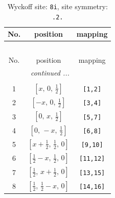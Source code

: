 \documentclass[fleqn,8pt]{jsarticle}
\begin{document}
\begin{longtable}{ccc}
\caption{Wyckoff site: {\tt 8i}, site symmetry: {\tt .2.}}
 \\
 \hline \hline
No. & position & mapping \\ \hline \endfirsthead

\multicolumn{2}{l}{\tablename\ \thetable{}} \\
 \hline \hline
No. & position & mapping \\ \hline \endhead

 \hline \hline
\multicolumn{2}{r}{\footnotesize\it continued ...} \\ \endfoot

 \hline \hline
\multicolumn{2}{r}{} \\ \endlastfoot

1 & $\left[ x,\, 0,\, \frac{1}{2} \right]$ & {\tt [1,2]} \\ \hline
2 & $\left[ - x,\, 0,\, \frac{1}{2} \right]$ & {\tt [3,4]} \\ \hline
3 & $\left[ 0,\, x,\, \frac{1}{2} \right]$ & {\tt [5,7]} \\ \hline
4 & $\left[ 0,\, - x,\, \frac{1}{2} \right]$ & {\tt [6,8]} \\ \hline
5 & $\left[ x + \frac{1}{2},\, \frac{1}{2},\, 0 \right]$ & {\tt [9,10]} \\ \hline
6 & $\left[ \frac{1}{2} - x,\, \frac{1}{2},\, 0 \right]$ & {\tt [11,12]} \\ \hline
7 & $\left[ \frac{1}{2},\, x + \frac{1}{2},\, 0 \right]$ & {\tt [13,15]} \\ \hline
8 & $\left[ \frac{1}{2},\, \frac{1}{2} - x,\, 0 \right]$ & {\tt [14,16]} \\
\end{longtable}
\renewcommand{\arraystretch}{1.2}
\end{document}
